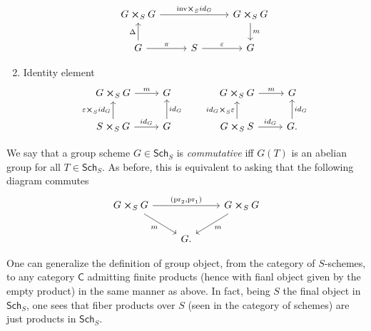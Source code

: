 \documentclass[../Main]{subfiles}
\begin{document}
\begin{rem}[]
\begin{enumerate}
\begin{equation*}
\begin{tikzcd}[column sep=2.7em]
				G \cross_{ S } G \arrow[rr, "\mathrm{inv} \cross_S id_G", rightarrow] & &
				G \cross_{ S } G \arrow[d, "m", rightarrow] \\
				G \arrow[u, "\Delta", rightarrow] 
				\arrow[r, "\pi", rightarrow] &
				S \arrow[r, "\varepsilon", rightarrow] & 
				G
			\end{tikzcd}
			\end{equation*} 
		\item Identity element 
			\begin{equation}
			\begin{tikzcd}
				G \cross_{ S } G \arrow[r, "m", rightarrow] &
				G \\
				S \cross_{ S } G \arrow[r, "id_G", rightarrow] 
				\arrow[u, "\varepsilon \cross_S id_G", rightarrow] &
				G \arrow[u, "id_G"', rightarrow] 
			\end{tikzcd}
			\qquad
			\begin{tikzcd}
				G \cross_{ S } G \arrow[r, "m", rightarrow] &
				G \\
				G \cross_{ S } S \arrow[r, "id_G", rightarrow] 
				\arrow[u, "id_G \cross_S \varepsilon", rightarrow] &
				G. \arrow[u, "id_G"', rightarrow] 
			\end{tikzcd}
			\end{equation} 
	\end{enumerate}
\end{rem}


\begin{defn}
	We say that a group scheme $G \in \mathsf{Sch}_{ S }$ is {\em commutative}
	iff $G(T)$ is an abelian group for all $T \in \mathsf{Sch}_{ S }$.
	As before, this is equivalent to asking that the following diagram commutes
	\begin{equation}
	\begin{tikzcd}
		G \cross_S G \arrow[rr, "{ \left(\mathrm{pr}_2, \mathrm{pr}_1\right)}", rightarrow] 
		\arrow[rd, "m"', rightarrow] & &
		G \cross_{ S } G
		\arrow[ld, "m", rightarrow] \\
					     &
		G
	.\end{tikzcd}
	\end{equation}
\end{defn}


\begin{rem}[]
	One can generalize the definition of group object, from the category
	of $S$-schemes, to any category $\mathsf{C}$ admitting finite products
	(hence with fianl object given by the empty product) in the same manner as above.
	In fact, being $S$ the final object in $\mathsf{Sch}_{ S }$, one sees
	that fiber products over $S$ (seen in the category of schemes)
	are just products in $\mathsf{Sch}_{ S }$.
\end{rem}
\end{document}
